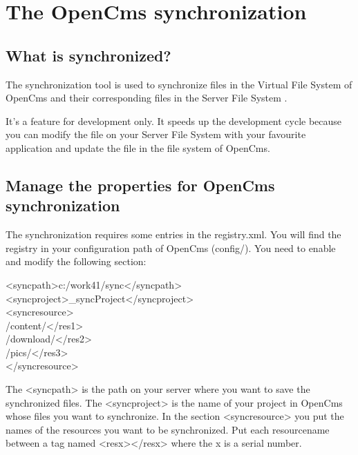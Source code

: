 \chapter{The OpenCms synchronization}
\label{synchronization}

\section{What is synchronized?}
The synchronization tool  is used to synchronize  files in the Virtual File System  of OpenCms and their corresponding files in the Server File System .

It's a feature for development only. It speeds up the development cycle because you can modify the file on your Server File System with your favourite application and update the file in the file system of OpenCms.

\section{Manage the properties for OpenCms synchronization}
The synchronization requires some entries in the {\dir
registry.xml}. You will find the registry in your configuration
path of OpenCms ({\dir config/}). You need to enable and modify
the following section:

\begin{xml}
<syncpath>c:/work41/sync</syncpath>\\
<syncproject>\_syncProject</syncproject>\\
<syncresource>\\
/content/</res1>\\
/download/</res2>\\
/pics/</res3>\\
</syncresource>\\
\end{xml}

The {\tag <syncpath>}  is the path on your server
where you want to save the synchronized files. The {\tag
<syncproject>}  is the name of your project in
OpenCms whose files you want to synchronize. In the section {\tag
<syncresource>}  you put the names of the
resources you want to be synchronized. Put each resourcename
between a tag named {\tag <resx></resx>} where the {\name x} is a
serial number.

